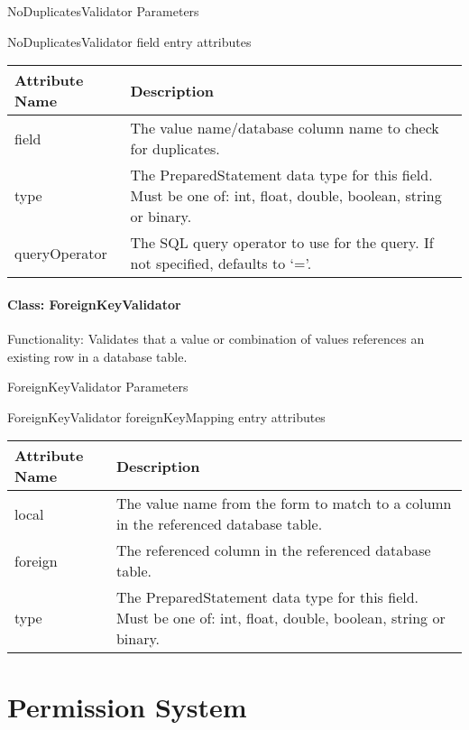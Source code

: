 \documentclass[letterpaper,10pt,english]{sphinxmanual}
\begin{document}
NoDuplicatesValidator Parameters

NoDuplicatesValidator field entry attributes

\begin{tabulary}{\linewidth}{|L|L|}
\hline
\textbf{
Attribute Name
} & \textbf{
Description
}\\\hline

field
 & 
The value name/database column name to check for duplicates.
\\\hline

type
 & 
The PreparedStatement data type for this field.  Must be one of: int, float, double,
boolean, string or binary.
\\\hline

queryOperator
 & 
The SQL query operator to use for the query.  If not specified, defaults to `='.
\\\hline
\end{tabulary}



\subsubsection{Class: ForeignKeyValidator}
\label{jaxFrameworkGuide:class-foreignkeyvalidator}
Functionality: Validates that a value or combination of values references an existing row in a
database table.

ForeignKeyValidator Parameters

ForeignKeyValidator foreignKeyMapping entry attributes

\begin{tabulary}{\linewidth}{|L|L|}
\hline
\textbf{
Attribute Name
} & \textbf{
Description
}\\\hline

local
 & 
The value name from the form to match to a column in the referenced database table.
\\\hline

foreign
 & 
The referenced column in the referenced database table.
\\\hline

type
 & 
The PreparedStatement data type for this field.  Must be one of: int, float, double,
boolean, string or binary.
\\\hline
\end{tabulary}



\chapter{Permission System}
\label{jaxFrameworkGuide:permission-system}
\end{document}
